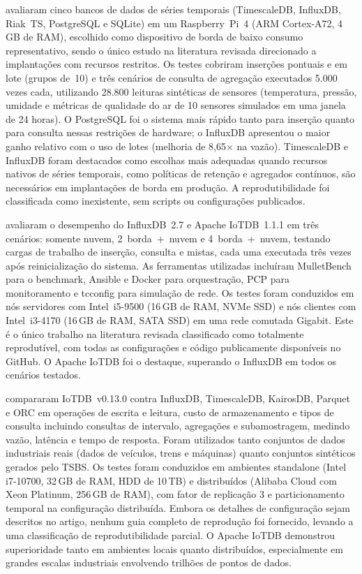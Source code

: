 \cite{grzesik2020comparative} avaliaram cinco bancos de dados de séries temporais (TimescaleDB,
InfluxDB, Riak~TS, PostgreSQL e SQLite) em um Raspberry~Pi~4 (ARM Cortex-A72, 4\,GB de RAM),
escolhido como dispositivo de borda de baixo consumo representativo, sendo o único estudo
na literatura revisada direcionado a implantações com recursos restritos. Os testes cobriram
inserções pontuais e em lote (grupos de~10) e três cenários de consulta de agregação executados
5.000 vezes cada, utilizando 28.800 leituras sintéticas de sensores (temperatura, pressão,
umidade e métricas de qualidade do ar de 10 sensores simulados em uma janela de 24 horas).
O PostgreSQL foi o sistema mais rápido tanto para inserção quanto para consulta nessas restrições
de hardware; o InfluxDB apresentou o maior ganho relativo com o uso de lotes (melhoria de
8,65$\times$ na vazão). TimescaleDB e InfluxDB foram destacados como escolhas mais adequadas
quando recursos nativos de séries temporais, como políticas de retenção e agregados contínuos,
são necessários em implantações de borda em produção. A reprodutibilidade foi classificada
como inexistente, sem scripts ou configurações publicados.

\cite{pereira2023mulletbench} avaliaram o desempenho do InfluxDB~2.7 e Apache IoTDB~1.1.1 em
três cenários: somente nuvem, 2~borda~+~nuvem e 4~borda~+~nuvem, testando cargas de trabalho
de inserção, consulta e mistas, cada uma executada três vezes após reinicialização do sistema.
As ferramentas utilizadas incluíram MulletBench para o benchmark, Ansible e Docker para
orquestração, PCP para monitoramento e tcconfig para simulação de rede. Os testes foram
conduzidos em nós servidores com Intel~i5-9500 (16\,GB de RAM, NVMe SSD) e nós clientes com
Intel~i3-4170 (16\,GB de RAM, SATA SSD) em uma rede comutada Gigabit. Este é o único trabalho
na literatura revisada classificado como totalmente reprodutível, com todas as configurações e
código publicamente disponíveis no GitHub. O Apache IoTDB foi o destaque, superando o InfluxDB
em todos os cenários testados.

\cite{wang2023iotdb} compararam IoTDB~v0.13.0 contra InfluxDB, TimescaleDB, KairosDB, Parquet
e ORC em operações de escrita e leitura, custo de armazenamento e tipos de consulta incluindo
consultas de intervalo, agregações e subamostragem, medindo vazão, latência e tempo de
resposta. Foram utilizados tanto conjuntos de dados industriais reais (dados de veículos, trens
e máquinas) quanto conjuntos sintéticos gerados pelo TSBS. Os testes foram conduzidos em
ambientes standalone (Intel i7-10700, 32\,GB de RAM, HDD de 10\,TB) e distribuídos (Alibaba
Cloud com Xeon Platinum, 256\,GB de RAM), com fator de replicação 3 e particionamento temporal
na configuração distribuída. Embora os detalhes de configuração sejam descritos no artigo,
nenhum guia completo de reprodução foi fornecido, levando a uma classificação de
reprodutibilidade parcial. O Apache IoTDB demonstrou superioridade tanto em ambientes locais
quanto distribuídos, especialmente em grandes escalas industriais envolvendo trilhões de pontos
de dados.

